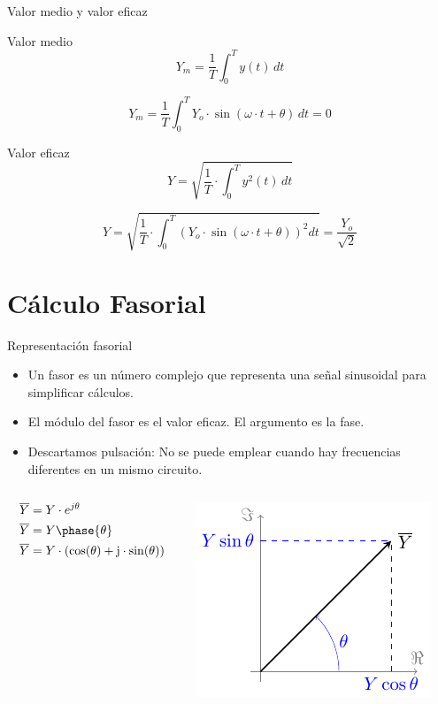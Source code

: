 \documentclass[aspectratio=169, usenames,svgnames,dvipsnames]{beamer}
\begin{document}
\begin{frame}[label={sec:orgeedd2ff}]{Valor medio y valor eficaz}
\begin{block}{Valor medio}
\[
Y_m=\frac{1}{T}\int_{0}^{T}y(t)\, dt
\]

\[
Y_m=\frac{1}{T}\int_{0}^{T}Y_{o}\cdot\sin(\omega \cdot t+\theta)\, dt=0
\]
\end{block}
\begin{block}{Valor eficaz}
\[
Y = \sqrt{\frac{1}{T}\cdot\int_{0}^{T}y^{2}(t)\, dt}
\]

\[
Y=\sqrt{\frac{1}{T}\cdot\int_{0}^{T}\left(Y_{o}\cdot\sin(\omega\cdot t+\theta)\right)^{2}dt}=\boxed{\frac{Y_{o}}{\sqrt{2}}}
\]
\end{block}
\end{frame}
\section{Cálculo Fasorial}
\label{sec:orgc80d484}

\begin{frame}[label={sec:org82a3048}]{Representación fasorial}
\begin{itemize}
\item Un fasor es un \alert{número complejo} que representa una señal sinusoidal para simplificar cálculos.
\item El \alert{módulo} del fasor es el \alert{valor eficaz}. El \alert{argumento} es la \alert{fase}.
\item Descartamos pulsación: No se puede emplear cuando hay frecuencias diferentes en un mismo circuito.
\end{itemize}

\begin{columns}
\begin{column}{0.5\columnwidth}
\begin{align*}
\overline{Y} &= Y\cdot e^{j\theta}\\
\overline{Y} &= Y\phase{\theta}\\
\overline{Y} &= Y\cdot(\cos(\theta)+\mathrm{j}\cdot\sin(\theta))
\end{align*}
\end{column}

\begin{column}{0.5\columnwidth}
\begin{center}
\includegraphics[height=0.45\textheight]{../figs/fasor.pdf}
\end{center}
\end{column}
\end{columns}
\end{frame}
\end{document}
